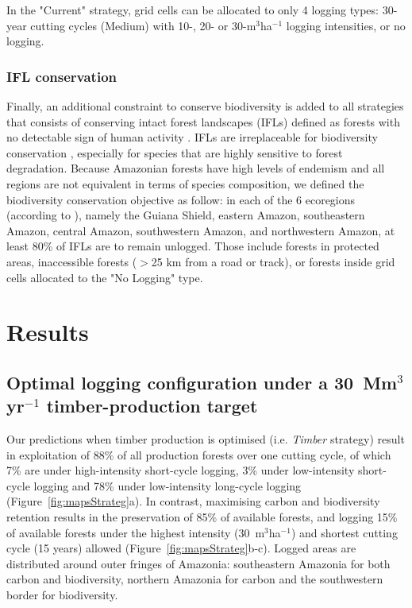\documentclass{article}
\begin{document}
In the "Current" strategy, grid cells can be allocated to only 4 logging types: 30-year cutting cycles (Medium) with 10-, 20- or 30-m$^3$ha$^{-1}$ logging intensities, or no logging. 

\subsubsection{IFL conservation}

Finally, an additional constraint to conserve biodiversity is added to all strategies that consists of conserving intact forest landscapes (IFLs) defined as forests with no detectable sign of human activity \cite{Potapov2017}. IFLs are irreplaceable for biodiversity conservation \cite{Gibson2011}, especially for species that are highly sensitive to forest degradation. Because Amazonian forests have high levels of endemism and all regions are not equivalent in terms of species composition, we defined the biodiversity conservation objective as follow: in each of the 6 ecoregions (according to \cite{TerSteege2013}), namely the Guiana Shield, eastern Amazon, southeastern Amazon, central Amazon, southwestern Amazon, and northwestern Amazon, at least 80\% of IFLs are to remain unlogged. Those include forests in protected areas, inaccessible forests ($>$25 km from a road or track), or forests inside grid cells allocated to the "No Logging" type. 


\section{Results}

\subsection{Optimal logging configuration under a 30~Mm$^3$yr$^{-1}$ timber-production target}

Our predictions when timber production is optimised (i.e. \textit{Timber} strategy) result in exploitation of 88\% of all production forests over one cutting cycle, of which 7\% are under high-intensity short-cycle logging, 3\% under low-intensity short-cycle logging and 78\% under low-intensity long-cycle logging (Figure~\ref{fig:mapsStrateg}a). In contrast, maximising carbon and biodiversity retention results in the preservation of 85\% of available forests, and logging 15\% of available forests under the highest intensity (30~m$^3$ha$^{-1}$) and shortest cutting cycle (15 years) allowed (Figure~\ref{fig:mapsStrateg}b-c). Logged areas are distributed around outer fringes of Amazonia: southeastern Amazonia for both carbon and biodiversity, northern Amazonia for carbon and the southwestern border for biodiversity. 
\end{document}
